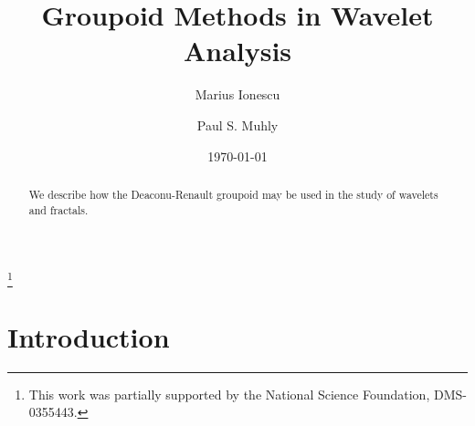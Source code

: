 \documentclass{amsproc}
\theoremstyle{plain}
\theoremstyle{definition}
\theoremstyle{definition}
\theoremstyle{remark}
\theoremstyle{plain}
\begin{document}
\title{Groupoid Methods in Wavelet Analysis}


\author{Marius Ionescu}


\author{Paul S. Muhly}




\date{\today}


\address{6188 Kemeny Hall, Dartmouth College Hanover, NH 03755-3551 }



\address{The University of Iowa, Iowa City, IA 52242-1419}




\thanks{This work was partially supported by the National Science Foundation,
DMS-0355443.}



\begin{abstract}
We describe how the Deaconu-Renault groupoid may be used in the study
of wavelets and fractals.
\end{abstract}




\maketitle

\section{Introduction}
\end{document}
